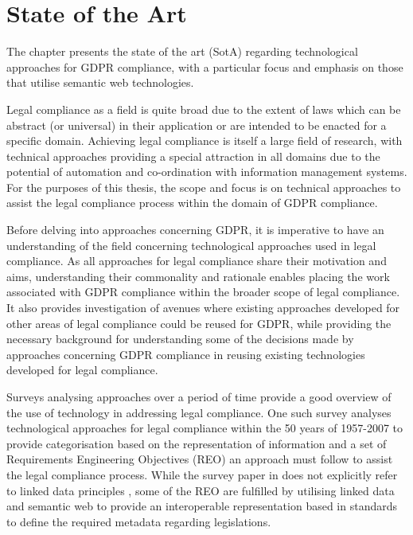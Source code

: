 \chapter{State of the Art}\label{chapter:sota}
The chapter presents the state of the art (SotA) regarding technological approaches for GDPR compliance, with a particular focus and emphasis on those that utilise semantic web technologies.

Legal compliance as a field is quite broad due to the extent of laws which can be abstract (or universal) in their application or are intended to be enacted for a specific domain.
Achieving legal compliance is itself a large field of research, with technical approaches providing a special attraction in all domains due to the potential of automation and co-ordination with information management systems.
For the purposes of this thesis, the scope and focus is on technical approaches to assist the legal compliance process within the domain of GDPR compliance.

Before delving into approaches concerning GDPR, it is imperative to have an understanding of the field concerning technological approaches used in legal compliance. As all approaches for legal compliance share their motivation and aims, understanding their commonality and rationale enables placing the work associated with GDPR compliance within the broader scope of legal compliance.
It also provides investigation of avenues where existing approaches developed for other areas of legal compliance could be reused for GDPR, while providing the necessary background for understanding some of the decisions made by approaches concerning GDPR compliance in reusing existing technologies developed for legal compliance.

Surveys analysing approaches over a period of time provide a good overview of the use of technology in addressing legal compliance.
One such survey  analyses technological approaches for legal compliance within the 50 years of 1957-2007 \cite{otto_addressing_2007} to provide categorisation based on the representation of information and a set of Requirements Engineering Objectives (REO) an approach must follow to assist the legal compliance process.
While the survey paper in does not explicitly refer to linked data principles \cite{bizer_linked_2011}, some of the REO are fulfilled by utilising linked data and semantic web to provide an interoperable representation based in standards to define the required metadata regarding legislations.

